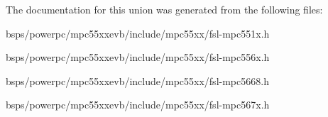 

The documentation for this union was generated from the following files\+:\begin{DoxyCompactItemize}
\item 
bsps/powerpc/mpc55xxevb/include/mpc55xx/fsl-\/mpc551x.\+h\item 
bsps/powerpc/mpc55xxevb/include/mpc55xx/fsl-\/mpc556x.\+h\item 
bsps/powerpc/mpc55xxevb/include/mpc55xx/fsl-\/mpc5668.\+h\item 
bsps/powerpc/mpc55xxevb/include/mpc55xx/fsl-\/mpc567x.\+h\end{DoxyCompactItemize}
